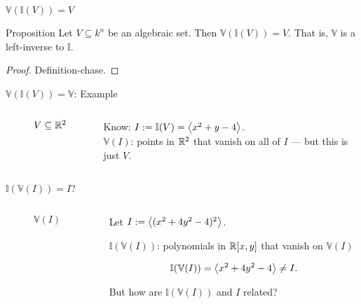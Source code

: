\documentclass{beamer}
\newcommand{\V}{\mathbb V}
\newcommand{\I}{\mathbb I}
\begin{document}
\begin{frame}{$\V(\I(V)) = V$}
\begin{block}{Proposition}
Let $V\subseteq k^n$ be an algebraic set. Then $\V(\I(V)) = V$. That is, $\V$ is a left-inverse to $\I$.
\end{block}
\begin{proof}
Definition-chase.
\end{proof}
\end{frame}
\begin{frame}{$\V(\I(V)) = \V$: Example}
\begin{columns}
\begin{column}{0.48\textwidth}
\begin{figure}[h!]
\centering
{}
\caption{$V\subseteq\mathbb R^2$}
\end{figure}
\end{column}
\begin{column}{0.48\textwidth}
Know: $I:=\I(V) = \gen{x^2+y-4}$. \\

$\V(I)$: points in $\mathbb R^2$ that vanish on all of $I$ \pause --- but this is just $V$.
\end{column}
\end{columns}
\end{frame}
\begin{frame}{$\I(\V(I))= I$?}
\begin{columns}
\begin{column}{0.48\textwidth}
\begin{figure}[h!]
\centering
{}
\caption{$\V(I)$}
\end{figure}
\end{column}
\begin{column}{0.48\textwidth}
Let $I:= \left\langle(x^2+4y^2-4)^2\right\rangle$. \pause

$\I(\V(I))$: polynomials in $\mathbb R[x,y]$ that vanish on $\V(I)$

$$\I(\V(I)) = \gen{x^2+4y^2-4} \neq I.$$ \pause

But how are $\I(\V(I))$ and $I$ related?
\end{column}
\end{columns}
\end{frame}
\end{document}
